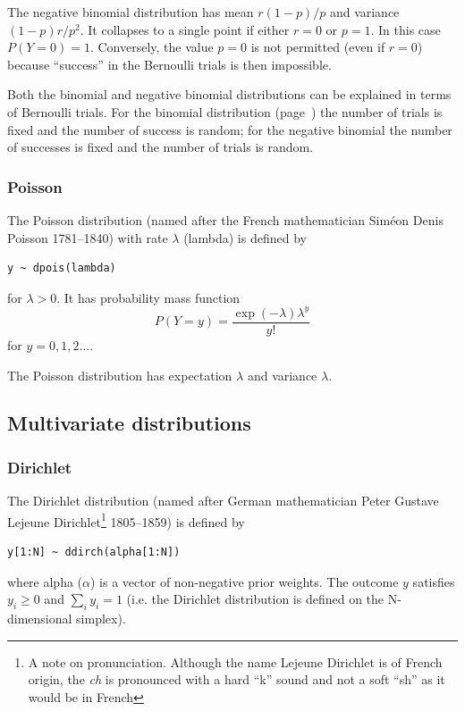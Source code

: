 \documentclass[11pt, a4paper, titlepage]{report}
\begin{document}
The negative binomial distribution has mean $r(1-p)/p$ and variance
$(1 - p)r/p^2$. It collapses to a single point if either $r=0$ or
$p=1$. In this case $P(Y=0) = 1$. Conversely, the value $p=0$ is not
permitted (even if $r=0$) because ``success'' in the Bernoulli trials
is then impossible.

Both the binomial and negative binomial distributions can be explained
in terms of Bernoulli trials. For the binomial distribution
(page~\pageref{bugs:dbin}) the number of trials is fixed and the number of
success is random; for the negative binomial the number of successes
is fixed and the number of trials is random.

\subsubsection{Poisson}

The Poisson distribution (named after the French mathematician
Sim\'{e}on Denis Poisson 1781--1840) with rate $\lambda$ (lambda) is
defined by
\begin{verbatim}
y ~ dpois(lambda)
\end{verbatim}
for $\lambda > 0$. It has probability mass function
\[
P(Y=y) = \frac{\textstyle \exp(-\lambda) \lambda^y}{\textstyle y!}
\]
for $y = 0, 1, 2 \ldots$.

The Poisson distribution has expectation $\lambda$ and variance $\lambda$.

\subsection{Multivariate distributions}

\subsubsection{Dirichlet}
\label{bugs:ddirch}

The Dirichlet distribution (named after German mathematician Peter
Gustave Lejeune Dirichlet\footnote{A note on pronunciation. Although
  the name Lejeune Dirichlet is of French origin, the {\em ch} is
  pronounced with a hard ``k'' sound and not a soft ``sh'' as it would
  be in French} 1805--1859) is defined by
\begin{verbatim}
y[1:N] ~ ddirch(alpha[1:N])
\end{verbatim}
where alpha ($\alpha$) is a vector of non-negative prior weights. The
outcome $y$ satisfies $y_i \geq 0$ and $\sum_i y_i = 1$ (i.e. the
Dirichlet distribution is defined on the N-dimensional simplex).
\end{document}
